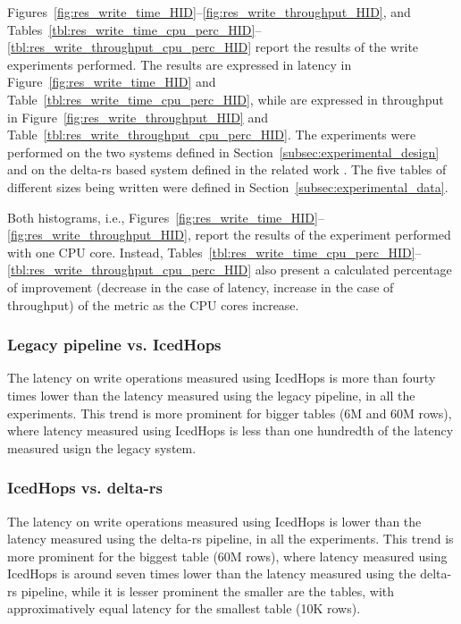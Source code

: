 Figures~\ref{fig:res_write_time_HID}--\ref{fig:res_write_throughput_HID}, and Tables~\ref{tbl:res_write_time_cpu_perc_HID}--\ref{tbl:res_write_throughput_cpu_perc_HID} report the results of the write experiments performed. The results are expressed in latency in Figure~\ref{fig:res_write_time_HID} and Table~\ref{tbl:res_write_time_cpu_perc_HID}, while are expressed in throughput in Figure~\ref{fig:res_write_throughput_HID} and Table~\ref{tbl:res_write_throughput_cpu_perc_HID}. The experiments were performed on the two systems defined in Section~\ref{subsec:experimental_design} and on the delta-rs based system defined in the related work \cite{manfrediReducingReadWrite2024}. The five tables of different sizes being written were defined in Section~\ref{subsec:experimental_data}.

Both histograms, i.e., Figures~\ref{fig:res_write_time_HID}--\ref{fig:res_write_throughput_HID}, report the results of the experiment performed with one \gls{CPU} core. Instead, Tables~\ref{tbl:res_write_time_cpu_perc_HID}--\ref{tbl:res_write_throughput_cpu_perc_HID} also present a calculated percentage of improvement (decrease in the case of latency, increase in the case of throughput) of the metric as the \gls{CPU} cores increase.

\subsubsection*{Legacy pipeline vs. IcedHops}
The latency on write operations measured using IcedHops is more than fourty times lower than the latency measured using the legacy pipeline, in all the experiments. This trend is more prominent for bigger tables (6M and 60M rows), where latency measured using IcedHops is less than one hundredth of the latency measured usign the legacy system.

\subsubsection*{IcedHops vs. delta-rs}
The latency on write operations measured using IcedHops is lower than the latency measured using the delta-rs pipeline, in all the experiments. This trend is more prominent for the biggest table (60M rows), where latency measured using IcedHops is around seven times lower than the latency measured using the delta-rs pipeline, while it is lesser prominent the smaller are the tables, with approximatively equal latency for the smallest table (10K rows).

